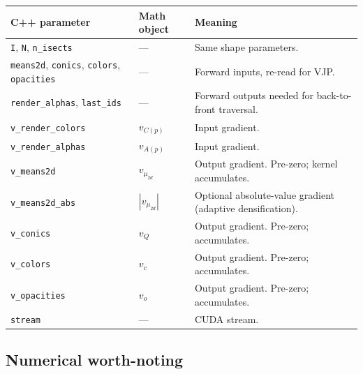 \documentclass[11pt]{article}
\begin{document}
\begin{center}
\begin{tabular}{l l p{7.5cm}}
\hline
\textbf{C++ parameter} & \textbf{Math object} & \textbf{Meaning} \\
\hline
\texttt{I}, \texttt{N}, \texttt{n\_isects} & --- & Same shape parameters. \\
\texttt{means2d}, \texttt{conics}, \texttt{colors}, \texttt{opacities} &
--- & Forward inputs, re-read for VJP. \\
\texttt{render\_alphas}, \texttt{last\_ids} & --- & Forward outputs
needed for back-to-front traversal. \\
\texttt{v\_render\_colors} & $v_{C(p)}$ & Input gradient. \\
\texttt{v\_render\_alphas} & $v_{A(p)}$ & Input gradient. \\
\texttt{v\_means2d} & $v_{\mu_{2d}}$ & Output gradient. Pre-zero;
kernel accumulates. \\
\texttt{v\_means2d\_abs} & $|v_{\mu_{2d}}|$ & Optional absolute-value
gradient (adaptive densification). \\
\texttt{v\_conics} & $v_Q$ & Output gradient. Pre-zero; accumulates. \\
\texttt{v\_colors} & $v_c$ & Output gradient. Pre-zero; accumulates. \\
\texttt{v\_opacities} & $v_o$ & Output gradient. Pre-zero; accumulates. \\
\texttt{stream} & --- & CUDA stream. \\
\hline
\end{tabular}
\end{center}

\subsection{Numerical worth-noting}
\end{document}
